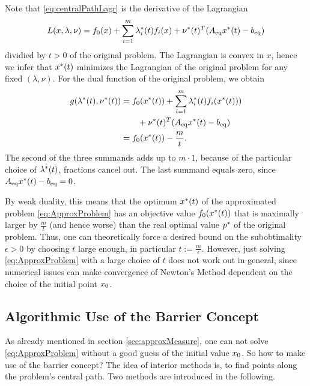 Note that \eqref{eq:centralPathLagr} is the derivative of the Lagrangian 
\[ L(x,\lambda,\nu) = f_0(x) + \sum_{i=1}^{m}\lambda_i^*(t) f_i(x) + \nu^*(t) ^T ({A}_{\mathrm{eq}} x^*(t) - {b}_{\mathrm{eq}}) \]
 dividied by $ t>0 $ of the original problem.
The Lagrangian is convex in $ x $, hence we infer that $ x^*(t) $ minimizes the Lagrangian  of the original problem for any fixed $ (\lambda,\nu) $.
For the dual function of the original problem, we obtain
\begin{align}
\begin{split}
	g(\lambda^*(t),\nu^*(t)) &= f_0(x^*(t)) + \sum_{i=1}^{m} \lambda_i^*(t) f_i(x^*(t)))\\&\qquad+\nu^*(t) ^T ({A}_{\mathrm{eq}} x^*(t) - {b}_{\mathrm{eq}})\\ & = f_0(x^*(t)) - \frac{m}{t}.
\end{split}
\end{align}
The second of the three summands adds up to $ m\cdot 1 $, because of the particular choice of $ \lambda^*(t) $,  fractions cancel out. The last summand equals zero, since $ {A}_{\mathrm{eq}} x^*(t) - {b}_{\mathrm{eq}} = 0$.






By weak duality, this means that the optimum $ x^*(t) $ of the approximated problem \eqref{eq:ApproxProblem} has an objective value $ f_0(x^*(t)) $ that is maximally larger  by $ \frac{m}{t} $ (and hence worse) than the real optimal value $ p^* $ of the original problem. Thus, one can theoretically force a desired bound on the subobtimality $ \epsilon >0 $ by choosing $ t $ large enough, in particular $ t := \frac{m}{\epsilon} $. However, just solving \eqref{eq:ApproxProblem} with a large choice of $ t $ does not work out in general, since numerical issues can make convergence of Newton's Method dependent on the choice of the initial point $ x_0 $.
\label{sec:approxMeasure}

\subsection{Algorithmic Use of the Barrier Concept}
As already mentioned in section \ref{sec:approxMeasure}, one can not solve  \eqref{eq:ApproxProblem}  without a good guess of the initial value $ x_0 $. So how to make use of the barrier concept? The idea of interior methods is, to find points along the problem's central path. Two methods are introduced in the following.
